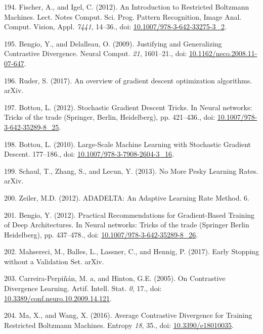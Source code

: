 \documentclass[11pt,a4paper,twoside]{book}
\theoremstyle{definition}
\theoremstyle{definition}
\theoremstyle{remark}
\begin{document}
\hypertarget{ref-Fischer2012}{}
194. Fischer, A., and Igel, C. (2012). An Introduction to Restricted
Boltzmann Machines. Lect. Notes Comput. Sci. Prog. Pattern Recognition,
Image Anal. Comput. Vision, Appl. \emph{7441}, 14--36., doi:
\href{https://doi.org/10.1007/978-3-642-33275-3_2}{10.1007/978-3-642-33275-3\_2}.

\hypertarget{ref-Bengio2009}{}
195. Bengio, Y., and Delalleau, O. (2009). Justifying and Generalizing
Contrastive Divergence. Neural Comput. \emph{21}, 1601--21., doi:
\href{https://doi.org/10.1162/neco.2008.11-07-647}{10.1162/neco.2008.11-07-647}.

\hypertarget{ref-Ruder2017}{}
196. Ruder, S. (2017). An overview of gradient descent optimization
algorithms. arXiv.

\hypertarget{ref-Bottou2012}{}
197. Bottou, L. (2012). Stochastic Gradient Descent Tricks. In Neural
networks: Tricks of the trade (Springer, Berlin, Heidelberg), pp.
421--436., doi:
\href{https://doi.org/10.1007/978-3-642-35289-8_25}{10.1007/978-3-642-35289-8\_25}.

\hypertarget{ref-Bottou2010}{}
198. Bottou, L. (2010). Large-Scale Machine Learning with Stochastic
Gradient Descent. 177--186., doi:
\href{https://doi.org/10.1007/978-3-7908-2604-3_16}{10.1007/978-3-7908-2604-3\_16}.

\hypertarget{ref-Schaul2013}{}
199. Schaul, T., Zhang, S., and Lecun, Y. (2013). No More Pesky Learning
Rates. arXiv.

\hypertarget{ref-Zeiler2012}{}
200. Zeiler, M.D. (2012). ADADELTA: An Adaptive Learning Rate Method. 6.

\hypertarget{ref-Bengio2012}{}
201. Bengio, Y. (2012). Practical Recommendations for Gradient-Based
Training of Deep Architectures. In Neural networks: Tricks of the trade
(Springer Berlin Heidelberg), pp. 437--478., doi:
\href{https://doi.org/10.1007/978-3-642-35289-8_26}{10.1007/978-3-642-35289-8\_26}.

\hypertarget{ref-Mahsereci2017}{}
202. Mahsereci, M., Balles, L., Lassner, C., and Hennig, P. (2017).
Early Stopping without a Validation Set. arXiv.

\hypertarget{ref-Carreira-Perpinan2005}{}
203. Carreira-Perpiñán, M. a, and Hinton, G.E. (2005). On Contrastive
Divergence Learning. Artif. Intell. Stat. \emph{0}, 17., doi:
\href{https://doi.org/10.3389/conf.neuro.10.2009.14.121}{10.3389/conf.neuro.10.2009.14.121}.

\hypertarget{ref-Ma2016}{}
204. Ma, X., and Wang, X. (2016). Average Contrastive Divergence for
Training Restricted Boltzmann Machines. Entropy \emph{18}, 35., doi:
\href{https://doi.org/10.3390/e18010035}{10.3390/e18010035}.
\end{document}
